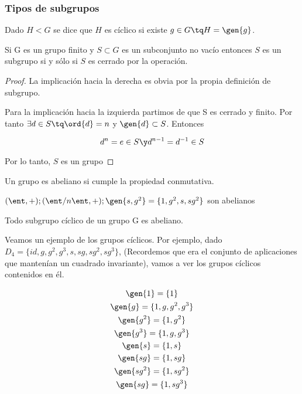 \documentclass[nochap]{apuntes}
\begin{document}
\subsubsection{Tipos de subgrupos}
\begin{defn}
   Dado $H<G$ se dice que $H$ es cíclico si existe $g\in G \tq H=\gen{g}$.
  \end{defn}

  \begin{theorem}
   Si G es un grupo finito y $S\subset G$ es un subconjunto no vacío entonces $S$ es un subgrupo si y sólo si $S$ es cerrado por la operación.   
  \end{theorem}
  
  \begin{proof}
   La implicación hacia la derecha es obvia por la propia definición de subgrupo.
   
   Para la implicación hacia la izquierda partimos de que S es cerrado y finito. Por tanto $\exists d \in S \tq \ord{d}=n$ y $\gen{d} \subset S$. Entonces
   
\[ d^{n}=e\in S \y d^{n-1}=d^{-1}\in S\]

Por lo tanto, $S$ es un grupo
  \end{proof}
  
  \begin{defn}
   Un grupo es abeliano si cumple la propiedad conmutativa.
  \end{defn}

  \begin{example}  $(\ent, +); (\ent/n\ent, +); \gen{s,g^{2}} =\{1,g^{2},s,sg^{2}\}$ son abelianos
  \end{example}
  
  \begin{lemma}
   Todo subgrupo cíclico de un grupo G es abeliano.
  \end{lemma}

Veamos un ejemplo de los grupos cíclicos. Por ejemplo, dado $D_{4}=\{id, g, g^{2}, g^{3}, s, sg, sg^{2},sg^{3}\}$, (Recordemos que era el conjunto de aplicaciones que mantenían un cuadrado invariante), vamos a ver los grupos cíclicos contenidos en él.
   
  \begin{gather*}
  \gen{1}=\{1\} \\
  \gen{g} =\{1,g,g^{2}, g^{3}\}\\
  \gen{g^{2}}=\{1,g^{2}\}\\
  \gen{g^{3}}=\{1,g, g^{3}\}\\
  \gen{s} =\{1,s\}\\
  \gen{sg}=\{1, sg\}\\
  \gen{sg^{2}} =\{1, sg^{2}\}\\
  \gen{sg}=\{1, sg^{3}\}
  \end{gather*}
   
\end{document}
